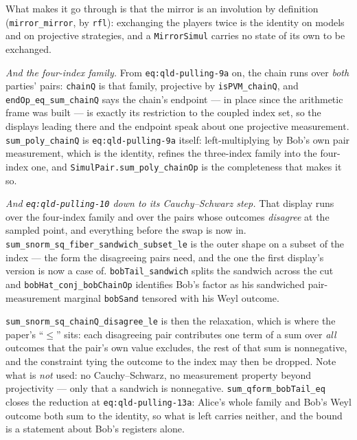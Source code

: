 What makes it go through is that the mirror is an involution by definition
(\texttt{mirror\_mirror}, by \texttt{rfl}): exchanging the players twice is the identity on models
and on projective strategies, and a \texttt{MirrorSimul} carries no state of its own to be
exchanged.

\emph{And the four-index family.} From \texttt{eq:qld-pulling-9a} on, the chain runs over
\emph{both} parties' pairs: \texttt{chainQ} is that family, projective by
\texttt{isPVM\_chainQ}, and \texttt{endOp\_eq\_sum\_chainQ} says the chain's endpoint --- in
place since the arithmetic frame was built --- is exactly its restriction to the coupled index set,
so the displays leading there and the endpoint speak about one projective measurement.
\texttt{sum\_poly\_chainQ} is \texttt{eq:qld-pulling-9a} itself: left-multiplying by Bob's own
pair measurement, which is the identity, refines the three-index family into the four-index one,
and \texttt{SimulPair.sum\_poly\_chainOp} is the completeness that makes it so.

\emph{And \texttt{eq:qld-pulling-10} down to its Cauchy--Schwarz step.} That display runs over
the four-index family and over the pairs whose outcomes \emph{disagree} at the sampled point, and
everything before the swap is now in. \texttt{sum\_snorm\_sq\_fiber\_sandwich\_subset\_le}
is the outer shape on a subset of the index --- the form the disagreeing pairs need, and the one
the first display's version is now a case of. \texttt{bobTail\_sandwich} splits the sandwich
across the cut and \texttt{bobHat\_conj\_bobChainOp} identifies Bob's factor as his sandwiched
pair-measurement marginal \texttt{bobSand} tensored with his Weyl outcome.

\texttt{sum\_snorm\_sq\_chainQ\_disagree\_le} is then the relaxation, which is where the
paper's ``$\leq$'' sits: each disagreeing pair contributes one term of a sum over \emph{all}
outcomes that the pair's own value excludes, the rest of that sum is nonnegative, and the
constraint tying the outcome to the index may then be dropped. Note what is \emph{not} used: no
Cauchy--Schwarz, no measurement property beyond projectivity --- only that a sandwich is
nonnegative. \texttt{sum\_qform\_bobTail\_eq} closes the reduction at
\texttt{eq:qld-pulling-13a}: Alice's whole family and Bob's Weyl outcome both sum to the identity,
so what is left carries neither, and the bound is a statement about Bob's registers alone.


